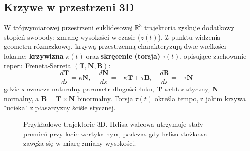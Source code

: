 \subsection{Krzywe w przestrzeni 3D}

W trójwymiarowej przestrzeni euklidesowej $\mathbb{R}^3$ trajektoria zyskuje dodatkowy stopień swobody: zmianę wysokości w czasie ($z(t)$). Z punktu widzenia geometrii różniczkowej, krzywą przestrzenną charakteryzują dwie wielkości lokalne: \textbf{krzywizna} $\kappa(t)$ oraz \textbf{skręcenie (torsja)} $\tau(t)$, opisujące zachowanie reperu Freneta-Serreta $(\mathbf{T}, \mathbf{N}, \mathbf{B})$:
\begin{equation}
    \frac{d\mathbf{T}}{ds} = \kappa \mathbf{N}, \quad 
    \frac{d\mathbf{N}}{ds} = -\kappa \mathbf{T} + \tau \mathbf{B}, \quad 
    \frac{d\mathbf{B}}{ds} = -\tau \mathbf{N}
\end{equation}
gdzie $s$ oznacza naturalny parametr długości łuku, $\mathbf{T}$ wektor styczny, $\mathbf{N}$ normalny, a $\mathbf{B} = \mathbf{T} \times \mathbf{N}$ binormalny. Torsja $\tau(t)$ określa tempo, z jakim krzywa "ucieka" z płaszczyzny ściśle stycznej.

\begin{figure}[ht]
    \centering
    \hspace{0.5cm}
    \caption{Przykładowe trajektorie 3D. Helisa walcowa utrzymuje stały promień przy locie wertykalnym, podczas gdy helisa stożkowa zawęża się w miarę zmiany wysokości.}
    \label{fig:krzywe3d}
\end{figure}

